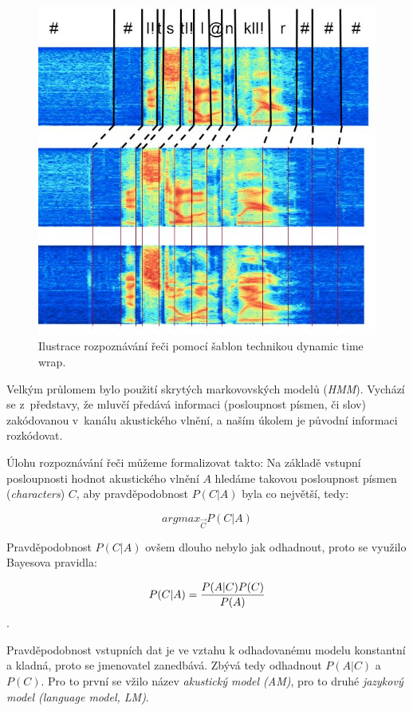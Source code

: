 \begin{figure}[htpb]
\includegraphics[scale=1]{rc/dtw.png}
\caption{
  Ilustrace rozpoznávání řeči pomocí šablon technikou dynamic time wrap.
}
\label{fig:dtw}
\end{figure}

Velkým průlomem bylo použití skrytých
markovovských modelů (\textit{HMM}). Vychází se z~představy, že mluvčí předává
informaci (posloupnost písmen, či slov) zakódovanou v~kanálu akustického vlnění,
a naším úkolem je původní informaci rozkódovat.

Úlohu rozpoznávání řeči můžeme formalizovat takto: Na základě vstupní
posloupnosti hodnot akustického vlnění $A$ hledáme takovou posloupnost písmen
(\textit{characters}) $C$, aby pravděpodobnost $P(C|A)$ byla co největší, tedy:

\begin{equation}
argmax_{\vec{C}} P(C|A)
\end{equation}

Pravděpodobnost $P(C|A)$ ovšem dlouho nebylo jak odhadnout, proto se využilo
Bayesova pravidla:

\begin{equation}
P(C|A) = {{P(A|C) P(C)}\over{P(A)}}
\end{equation}.

Pravděpodobnost vstupních dat je ve vztahu k odhadovanému modelu konstantní a
kladná, proto se jmenovatel zanedbává. Zbývá tedy odhadnout $P(A|C)$ a $P(C)$.
Pro to první se vžilo název \textit{akustický model (AM)}, pro to druhé
\textit{jazykový model (language model, LM)}.


